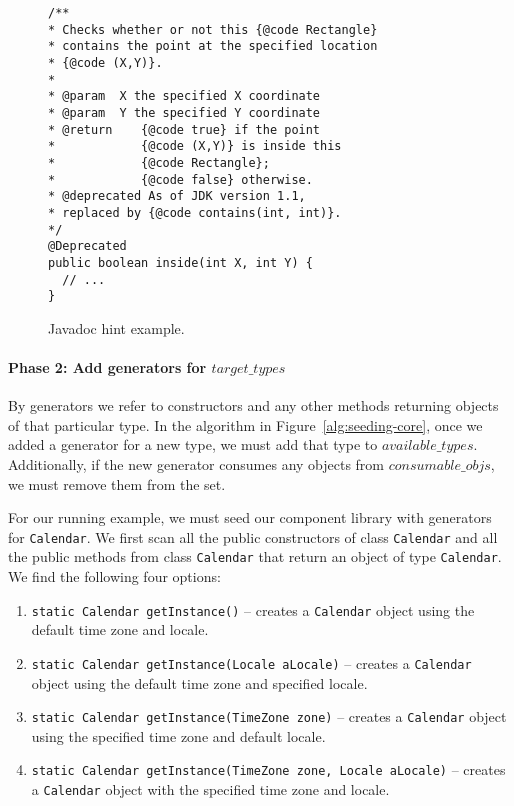 \documentclass[sigconf,review,anonymous]{acmart}
\begin{document}
\begin{figure}
\begin{lstlisting}[mathescape=true,showstringspaces=false]
/**
* Checks whether or not this {@code Rectangle}
* contains the point at the specified location
* {@code (X,Y)}.
*
* @param  X the specified X coordinate
* @param  Y the specified Y coordinate
* @return    {@code true} if the point
*            {@code (X,Y)} is inside this
*            {@code Rectangle};
*            {@code false} otherwise.
* @deprecated As of JDK version 1.1,
* replaced by {@code contains(int, int)}.
*/
@Deprecated
public boolean inside(int X, int Y) {
  // ...
}
\end{lstlisting}
\caption{Javadoc hint example.}
\label{ex:javadoc-hint}
\end{figure}




\paragraph{{\bf Phase 2: Add generators for $target\_types$}}

By generators we refer to constructors and any other methods returning
objects of that particular type.  In the algorithm in
Figure~\ref{alg:seeding-core}, once we added a generator for a new type, we
must add that type to $\mathit{available\_types}$.  Additionally, if the new
generator consumes any objects from $\mathit{consumable\_objs}$, we must
remove them from the set.

For our running example, we must seed our component library with generators for \lstinline[breaklines=true]{Calendar}.
%
We first scan all the public constructors of class \lstinline[breaklines=true]{Calendar}
and all the public methods from class \lstinline[breaklines=true]{Calendar} that return an object of type \lstinline[breaklines=true]{Calendar}. We find the following four options:

\begin{enumerate}
  \item \lstinline[breaklines=true]{static Calendar	getInstance()} -- creates a \lstinline[breaklines=true]{Calendar} object using the default time zone and locale.
  \item \lstinline[breaklines=true]{static Calendar getInstance(Locale aLocale)} -- creates a \lstinline[breaklines=true]{Calendar} object using the default time zone and specified locale.
  \item \lstinline[breaklines=true]{static Calendar	getInstance(TimeZone zone)} -- creates a \lstinline[breaklines=true]{Calendar} object using the specified time zone and default locale.
  \item \lstinline[breaklines=true]{static Calendar	getInstance(TimeZone zone, Locale aLocale)} -- creates a \lstinline[breaklines=true]{Calendar} object with the specified time zone and locale.
\end{enumerate}
\end{document}
